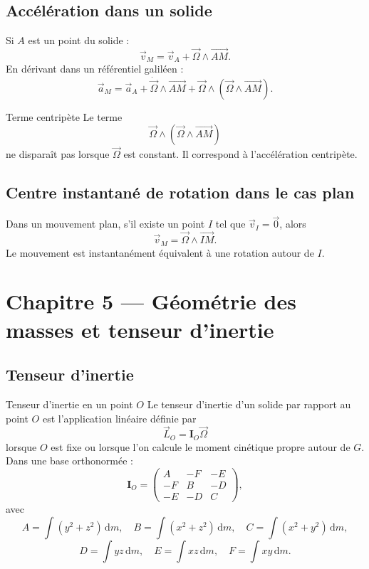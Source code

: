\documentclass[11pt,a4paper]{article}
\newcommand{\vect}[1]{\overrightarrow{#1}}
\newcommand{\dd}{\,\mathrm{d}}
\newcommand{\mat}[1]{\mathbf{#1}}
\begin{document}
\subsection{Accélération dans un solide}

Si $A$ est un point du solide :
\[
\vec v_M=\vec v_A+\vec\Omega\wedge\vect{AM}.
\]
En dérivant dans un référentiel galiléen :
\[
\vec a_M
=
\vec a_A+\dot{\vec\Omega}\wedge\vect{AM}
+\vec\Omega\wedge(\vec\Omega\wedge\vect{AM}).
\]

\begin{warningbox}{Terme centripète}{}
Le terme
\[
\vec\Omega\wedge(\vec\Omega\wedge\vect{AM})
\]
ne disparaît pas lorsque $\vec\Omega$ est constant. Il correspond à l'accélération centripète.
\end{warningbox}

\subsection{Centre instantané de rotation dans le cas plan}

Dans un mouvement plan, s'il existe un point $I$ tel que $\vec v_I=\vec 0$, alors
\[
\vec v_M=\vec\Omega\wedge\vect{IM}.
\]
Le mouvement est instantanément équivalent à une rotation autour de $I$.

\section{Chapitre 5 — Géométrie des masses et tenseur d'inertie}

\subsection{Tenseur d'inertie}

\begin{definitionbox}{Tenseur d'inertie en un point $O$}{}
Le tenseur d'inertie d'un solide par rapport au point $O$ est l'application linéaire définie par
\[
\vec L_O=\mat I_O\vec\Omega
\]
lorsque $O$ est fixe ou lorsque l'on calcule le moment cinétique propre autour de $G$.
Dans une base orthonormée :
\[
\mat I_O=
\begin{pmatrix}
A & -F & -E\\
-F & B & -D\\
-E & -D & C
\end{pmatrix},
\]
avec
\[
A=\int(y^2+z^2)\dd m,\quad
B=\int(x^2+z^2)\dd m,\quad
C=\int(x^2+y^2)\dd m,
\]
\[
D=\int yz\dd m,\quad
E=\int xz\dd m,\quad
F=\int xy\dd m.
\]
\end{definitionbox}
\end{document}
